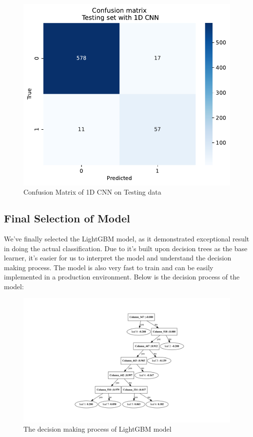 \documentclass[10pt,letterpaper]{article}
\begin{document}
\begin{figure}[H]
    \centering
    \includegraphics[width=0.5\linewidth]{plots/1dcnn_confusion_matrix.pdf}
    \caption{Confusion Matrix of 1D CNN on Testing data}
    \label{fig:confusion-matrix-1dcnn}
\end{figure}

\subsection{Final Selection of Model}
We've finally selected the LightGBM model, as it demonstrated exceptional result in doing the actual classification. Due to it's built upon decision trees as the base learner, it's easier for us to interpret the model and understand the decision making process. The model is also very fast to train and can be easily implemented in a production environment. Below is the decision process of the model:

\begin{figure}[H]
    \centering
    \includegraphics[width=\linewidth]{plots/lgbm_tree_vert.pdf}
    \caption{The decision making process of LightGBM model}
    \label{fig:confusion-matrix-transformer}
\end{figure}
\end{document}
